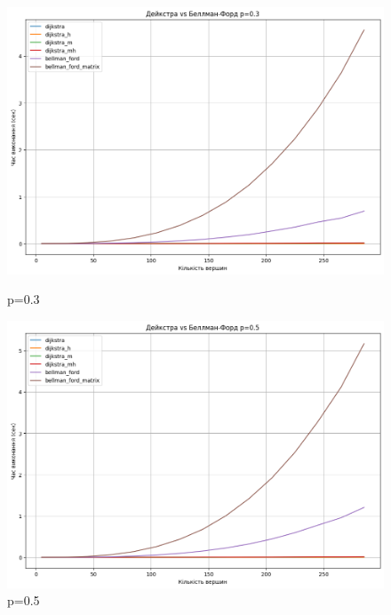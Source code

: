 \documentclass[a4paper,12pt]{article}
\begin{document}
\begin{figure}[ht]
    \centering
    \begin{minipage}{0.45\textwidth}
        \centering
        \includegraphics[width=\textwidth]{img/all03.png}
        \caption{p=0.3}
        \label{fig:all03}
    \end{minipage}
    \hfill
    \begin{minipage}{0.45\textwidth}
        \centering
        \includegraphics[width=\textwidth]{img/all05.png}
        \caption{p=0.5}
        \label{fig:all05}
    \end{minipage}
    

\end{figure}
\end{document}
